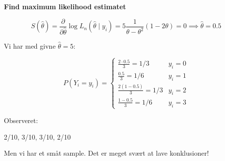\textbf{Find maximum likelihood estimatet}

\begin{equation}
    S(\hat{\theta}) = \frac{\partial}{\partial \hat{\theta}} \log L_n (\hat{\theta } \mid y_i) =5 \frac{1}{\theta - \theta^2} (1 - 2\theta) = 0 \implies \hat{\theta} = 0.5
\end{equation}

Vi har med givne $\hat{\theta} = 5$:



\begin{equation}
    P(Y_i = y_i) = \begin{cases}
        \frac{2\cdot 0.5}{3} = 1/3 & y_i=0\\
        \frac{0.5}{3} = 1/6 & y_i=1 \\
        \frac{2(1-0.5)}{3} = 1/3 & y_i=2 \\
        \frac{1- 0.5}{3} = 1/6 & y_i= 3
    \end{cases}
\end{equation}


Observeret:

2/10, 3/10, 3/10, 2/10

Men vi har et småt sample. Det er meget svært at lave konklusioner!
